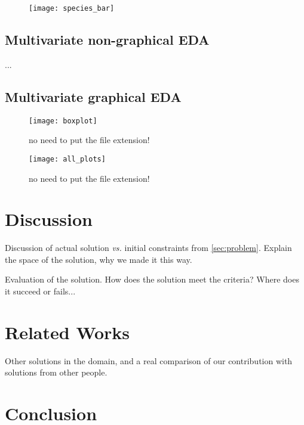 \documentclass{article}
\begin{document}
\begin{figure}[H]
  \begin{center}
  \texttt{[image: species\_bar]}
  \end{center}
\end{figure}

\subsection{Multivariate non-graphical EDA}
...

\subsection{Multivariate graphical EDA}
\begin{figure}[H]
  \begin{center}
  \texttt{[image: boxplot]}
  \caption{no need to put the file extension!}
  \end{center}
\end{figure}

\begin{figure}[!htp]
  \begin{center}
  \texttt{[image: all\_plots]}
  \caption{no need to put the file extension!}
  \end{center}
\end{figure}


\section{Discussion}
\label{sec:discussion}

Discussion of actual solution \emph{vs.} initial constraints from
\ref{sec:problem}. Explain the space of the solution, why we made it this way.

Evaluation of the solution. How does the solution meet the criteria? Where
does it succeed or fails...


\section{Related Works}
\label{sec:related}

Other solutions in the domain, and a real comparison of our contribution with
solutions from other people.


\section{Conclusion}
\label{sec:conclusion}
\end{document}
